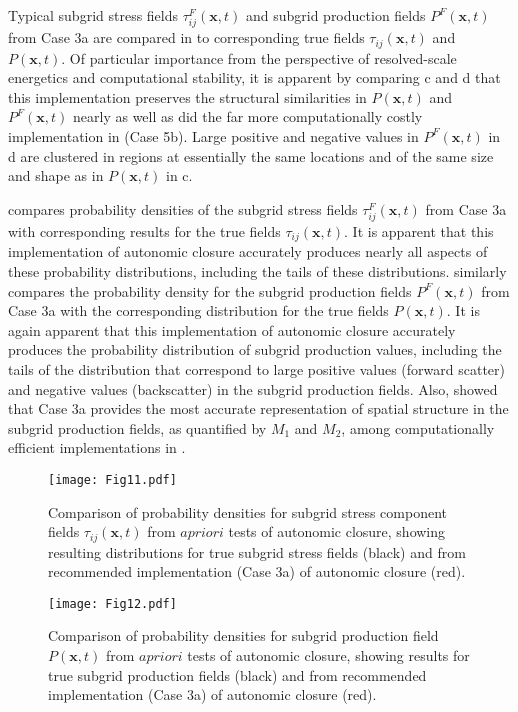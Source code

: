 Typical subgrid stress fields  $\tau_{ij}^{F}(\mathbf{x},t)$ and subgrid production fields $P^{F}(\mathbf{x},t)$  from Case 3a are compared in  to corresponding true fields $\tau_{ij}(\mathbf{x},t)$  and $P(\mathbf{x},t)$. Of particular importance from the perspective of resolved-scale energetics and computational stability, it is apparent by comparing c and d that this implementation preserves the structural similarities in  $P(\mathbf{x},t)$ and $P^{F}(\mathbf{x},t)$  nearly as well as did the far more computationally costly implementation in  (Case 5b). Large positive and negative values in $P^{F}(\mathbf{x},t)$ in d are clustered in regions at essentially the same locations and of the same size and shape as in $P(\mathbf{x},t)$  in c. 

 compares probability densities of the subgrid stress fields $\tau_{ij}^{F}(\mathbf{x},t)$  from Case 3a with corresponding results for the true fields $\tau_{ij}(\mathbf{x},t)$. It is apparent that this implementation of autonomic closure accurately produces nearly all aspects of these probability distributions, including the tails of these distributions.  similarly compares the probability density for the subgrid production fields $P^{F}(\mathbf{x},t)$  from Case 3a with the corresponding distribution for the true fields $P(\mathbf{x},t)$. It is again apparent that this implementation of autonomic closure accurately produces the probability distribution of subgrid production values, including the tails of the distribution that correspond to large positive values (forward scatter) and negative values (backscatter) in the subgrid production fields. Also,  showed that Case 3a provides the most accurate representation of spatial structure in the subgrid production fields, as quantified by  $M_1$ and $M_2$, among computationally efficient implementations in . 

%
\begin{figure}
	\begin{center}
	\texttt{[image: Fig11.pdf]}
	\caption{Comparison of probability densities for subgrid stress component fields $\tau_{ij}(\mathbf{x},t)$ from $a priori$ tests of autonomic closure, showing resulting distributions for true subgrid stress fields (black) and from recommended implementation (Case 3a) of autonomic closure (red).}
	\label{F:11}
	\end{center}
\end{figure}
%
%
%
\begin{figure}
	\begin{center}
	\texttt{[image: Fig12.pdf]}
	\caption{Comparison of probability densities for subgrid production field $P(\mathbf{x},t)$ from $a priori$ tests of autonomic closure, showing results for true subgrid production fields (black) and from recommended implementation (Case 3a) of autonomic closure (red).}
	\label{F:12}
	\end{center}
\end{figure}
%
%

